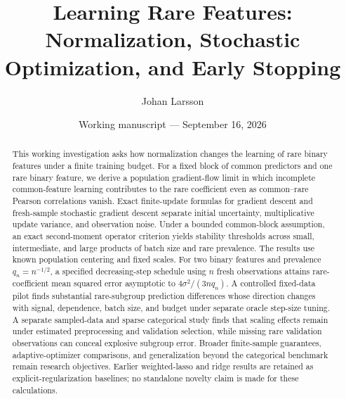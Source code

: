 \documentclass[11pt]{article}
\title{
  Learning Rare Features: Normalization, Stochastic Optimization, and Early
  Stopping
}
\author{Johan Larsson}
\date{Working manuscript --- September 16, 2026}
\theoremstyle{remark}
\begin{document}
\maketitle

\begin{abstract}
  This working investigation asks how normalization changes the learning of rare
  binary features under a finite training budget. For a fixed block of common
  predictors and one rare binary feature, we derive a population gradient-flow
  limit in which incomplete common-feature learning contributes to the rare
  coefficient even as common--rare Pearson correlations vanish. Exact
  finite-update formulas for gradient descent and fresh-sample stochastic
  gradient descent separate initial uncertainty, multiplicative update variance,
  and observation noise. Under a bounded common-block assumption, an exact
  second-moment operator criterion yields stability thresholds across small,
  intermediate, and large products of batch size and rare prevalence. The
  results use known population centering and fixed scales. For two binary
  features and prevalence $q_n = n^{-1/2}$, a specified decreasing-step schedule
  using $n$ fresh observations attains rare-coefficient mean squared error
  asymptotic to $4\sigma^2/(3nq_n)$. A controlled fixed-data pilot finds
  substantial rare-subgroup prediction differences whose direction changes with
  signal, dependence, batch size, and budget under separate oracle step-size
  tuning. A separate sampled-data and sparse categorical study finds that
  scaling effects remain under estimated preprocessing and validation selection,
  while missing rare validation observations can conceal explosive subgroup
  error. Broader finite-sample guarantees, adaptive-optimizer comparisons, and
  generalization beyond the categorical benchmark remain research objectives.
  Earlier weighted-lasso and ridge results are retained as
  explicit-regularization baselines; no standalone novelty claim is made for
  these calculations.
\end{abstract}
















\appendix





\end{document}
